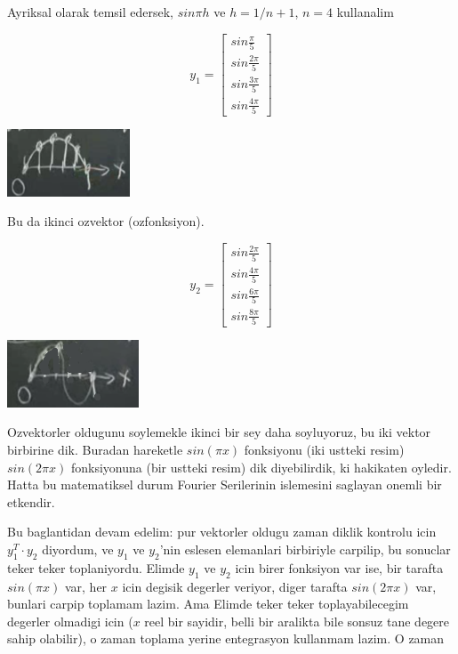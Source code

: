 \documentclass[12pt,fleqn]{article}\usepackage{../common}
\begin{document}
Ayriksal olarak temsil edersek, $sin\pi h$ ve $h = 1 / n+1$, $n = 4$
kullanalim

\[ 
y_1 = 
\left[\begin{array}{c}
sin \frac{\pi}{5} \\
sin \frac{2\pi}{5} \\
sin \frac{3\pi}{5} \\
sin \frac{4\pi}{5} 
\end{array}\right]
 \]


\includegraphics[height=2cm]{6_2.png}

Bu da ikinci ozvektor (ozfonksiyon). 

\[ 
y_2 = 
\left[\begin{array}{c}
sin \frac{2\pi}{5} \\
sin \frac{4\pi}{5} \\
sin \frac{6\pi}{5} \\
sin \frac{8\pi}{5} 
\end{array}\right]
 \]

\includegraphics[height=2cm]{6_3.png}

Ozvektorler oldugunu soylemekle ikinci bir sey daha soyluyoruz, bu iki
vektor birbirine dik. Buradan hareketle $sin(\pi x)$ fonksiyonu (iki
ustteki resim) $sin(2\pi x)$ fonksiyonuna (bir ustteki resim) dik
diyebilirdik, ki hakikaten oyledir. Hatta bu matematiksel durum Fourier
Serilerinin islemesini saglayan onemli bir etkendir.

Bu baglantidan devam edelim: pur vektorler oldugu zaman diklik kontrolu icin
$y_1^T \cdot y_2$ diyordum, ve $y_1$ ve $y_2$'nin eslesen elemanlari birbiriyle 
carpilip, bu sonuclar teker teker toplaniyordu. Elimde $y_1$ ve $y_2$ icin 
birer fonksiyon var ise, bir tarafta $sin(\pi x)$ var, her $x$ icin degisik
degerler veriyor, diger tarafta $sin(2\pi x)$ var, bunlari carpip toplamam
lazim. Ama Elimde teker teker toplayabilecegim degerler olmadigi icin ($x$ reel
bir sayidir, belli bir aralikta bile sonsuz tane degere sahip olabilir), o
zaman toplama yerine entegrasyon kullanmam lazim. O zaman
\end{document}
